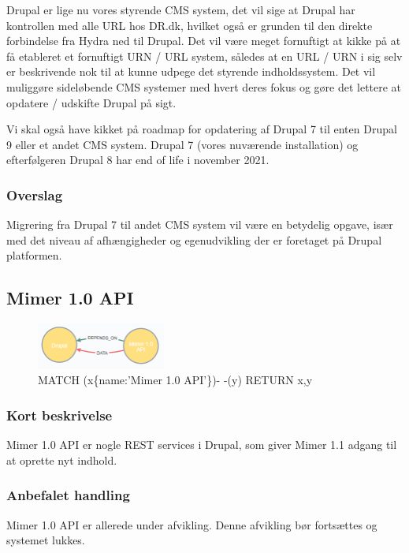 \documentclass{article}
\begin{document}
Drupal er lige nu vores styrende CMS system, det vil sige at Drupal har kontrollen med alle URL hos DR.dk, hvilket også er grunden til den direkte forbindelse fra Hydra ned til Drupal. Det vil være meget fornuftigt at kikke på at få etableret et fornuftigt URN / URL system, således at en URL / URN i sig selv er beskrivende nok til at kunne udpege det styrende indholdssystem. Det vil muliggøre sideløbende CMS systemer med hvert deres fokus og gøre det lettere at opdatere / udskifte Drupal på sigt.
 
Vi skal også have kikket på roadmap for opdatering af Drupal 7 til enten Drupal 9 eller et andet CMS system. Drupal 7 (vores nuværende installation) og efterfølgeren Drupal 8 har end of life i november 2021.
\subsubsection*{Overslag}
Migrering fra Drupal 7 til andet CMS system vil være en betydelig opgave, især med det niveau af afhængigheder og egenudvikling der er foretaget på Drupal platformen. 


\subsection{Mimer 1.0 API}
\begin{figure}[h]
\includegraphics[width=120pt]{MimerAPI.PNG}
\caption{MATCH (x\{name:'Mimer 1.0 API'\})- -(y) RETURN x,y}
\end{figure}
\subsubsection*{Kort beskrivelse}
Mimer 1.0 API er nogle REST services i Drupal, som giver Mimer 1.1 adgang til at oprette nyt indhold.
\subsubsection*{Anbefalet handling}
Mimer 1.0 API er allerede under afvikling. Denne afvikling bør fortsættes og systemet lukkes.
\end{document}
